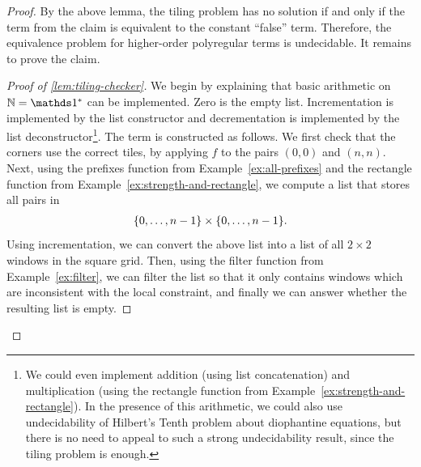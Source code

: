 \begin{proof}
By the above lemma, the tiling problem has no solution if and only if the term from the claim is equivalent to the constant ``false'' term. Therefore, the equivalence problem for higher-order polyregular terms is undecidable. It remains to prove the claim.
\begin{proof}[Proof of \cref{lem:tiling-checker}]
    We begin by explaining that basic arithmetic on $\Nat = \onetype^*$ can be implemented. Zero is the empty list. Incrementation is implemented by the list constructor and  decrementation is implemented by the list deconstructor\footnote{We could even implement addition (using list concatenation) and multiplication (using the rectangle function from Example~\ref{ex:strength-and-rectangle}).  In the presence of this arithmetic, we could also use undecidability of  Hilbert's Tenth problem about diophantine equations, but there is no need to appeal to such a strong undecidability result, since the tiling problem is enough. }. 
The term is constructed as follows. We first check that the corners  use the correct tiles, by applying $f$ to the pairs $(0,0)$ and $(n,n)$. Next, using the prefixes function from Example~\ref{ex:all-prefixes} and the rectangle function from Example~\ref{ex:strength-and-rectangle}, we  compute a list that stores  all pairs in 
    \begin{align*}
    \{0,\ldots,n-1\} \times \{0,\ldots,n-1\}.
    \end{align*}
    Using incrementation, we can convert the above list into a list of all $2 \times 2$ windows in the square grid.
    Then, using the filter function from Example~\ref{ex:filter}, we can filter the list so that it only contains windows which are inconsistent with the local constraint, and finally we can answer whether the resulting list is empty. 
\end{proof}
\end{proof}


\exerciseheader

